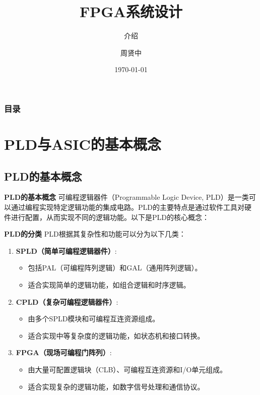 \documentclass{beamer}
\title{FPGA系统设计}
\subtitle{介绍}
\author{周贤中}
\institute{广东工业大学集成电路学院}
\date{\today}
\providecommand{\tightlist}{%
  \setlength{\itemsep}{0pt}\setlength{\parskip}{0pt}}
\begin{document}
\begin{frame}
\titlepage
\end{frame}

\begin{frame}
\frametitle{目录}
\tableofcontents
\end{frame}

\section{PLD与ASIC的基本概念}
\subsection{PLD的基本概念}
\begin{frame}{\textbf{PLD的基本概念}}
可编程逻辑器件（Programmable Logic Device,
PLD）是一类可以通过编程实现特定逻辑功能的集成电路。PLD的主要特点是通过软件工具对硬件进行配置，从而实现不同的逻辑功能。以下是PLD的核心概念：
\end{frame}

\begin{frame}{\textbf{PLD的分类}}
PLD根据其复杂性和功能可以分为以下几类：

\begin{enumerate}
\tightlist
\item
    \textbf{SPLD（简单可编程逻辑器件）}:

    \begin{itemize}
    \tightlist
    \item
    包括PAL（可编程阵列逻辑）和GAL（通用阵列逻辑）。\\
    \item
    适合实现简单的逻辑功能，如组合逻辑和时序逻辑。\\
    \end{itemize}
\item
    \textbf{CPLD（复杂可编程逻辑器件）}:

    \begin{itemize}
    \tightlist
    \item
    由多个SPLD模块和可编程互连资源组成。\\
    \item
    适合实现中等复杂度的逻辑功能，如状态机和接口转换。\\
    \end{itemize}
\item
    \textbf{FPGA（现场可编程门阵列）}:

    \begin{itemize}
    \tightlist
    \item
    由大量可配置逻辑块（CLB）、可编程互连资源和I/O单元组成。\\
    \item
    适合实现复杂的逻辑功能，如数字信号处理和通信协议。
    \end{itemize}
\end{enumerate}
\end{frame}
\end{document}

